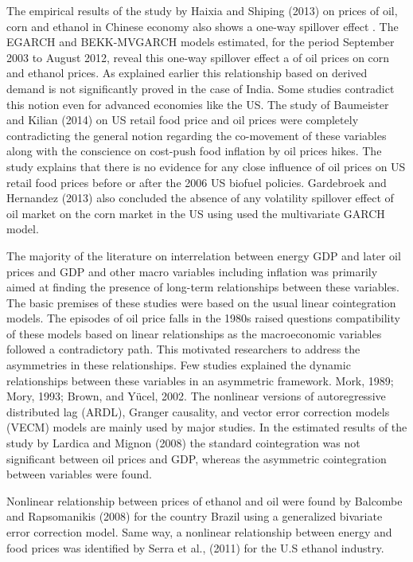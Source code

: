 \documentclass[a4paper,12pt]{article}
\begin{document}
The empirical results of the study by Haixia and Shiping (2013) on prices of oil, corn and ethanol in Chinese economy also shows a one-way spillover effect . 
The EGARCH and BEKK-MVGARCH models estimated, for the period September 2003 to August 2012, reveal this one-way spillover effect a of oil prices on corn and ethanol prices. As explained earlier this relationship based on derived demand is not significantly proved in the case of India. Some studies contradict this notion even for advanced economies like the US. The study of Baumeister and Kilian (2014) on US retail food price and oil prices were completely contradicting the general notion regarding the co-movement of these variables along with the conscience on cost-push food inflation by oil prices hikes. The study explains that there is no evidence for any close influence of oil prices on US retail food prices before or after the 2006 US biofuel policies. Gardebroek and Hernandez (2013) also concluded the absence of any volatility spillover effect of oil market on the corn market in the US using used the multivariate GARCH model.


The majority of the literature on interrelation between energy GDP and later oil prices and GDP and other macro variables including inflation was primarily aimed at finding the presence of long-term relationships between these variables. The basic premises of these studies were based on the usual linear cointegration models. The episodes of oil price falls in the 1980s raised questions compatibility of these models based on linear relationships as the macroeconomic variables followed a contradictory path. This motivated researchers to address the asymmetries in these relationships. Few studies explained the dynamic relationships between these variables in an asymmetric framework. Mork, 1989; Mory, 1993; Brown, and Yücel, 2002. The nonlinear versions of autoregressive distributed lag (ARDL), Granger causality, and vector error correction models (VECM) models are mainly used by major studies. In the estimated results of the study by Lardica and Mignon (2008) the standard cointegration was not significant between oil prices and GDP, whereas the asymmetric cointegration between variables were found.

Nonlinear relationship between prices of ethanol and oil were found by Balcombe and Rapsomanikis (2008) for the country Brazil using a generalized bivariate error correction model.
Same way, a nonlinear relationship between energy and food prices was identified by Serra et al., (2011) for the U.S ethanol industry.
\end{document}
